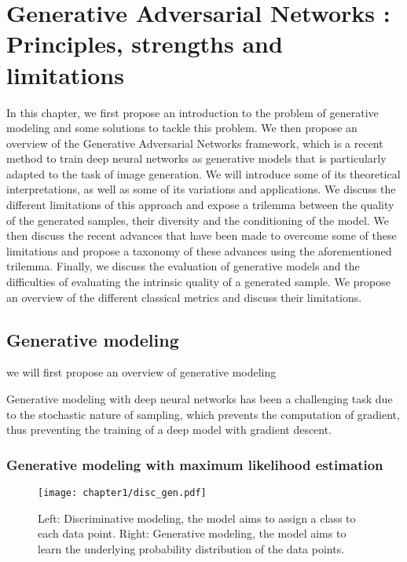 \chapter{Generative Adversarial Networks : Principles, strengths and limitations}
\label{chap:chapter1}

\begin{chapterabstract}
	In this chapter, we first propose an introduction to the problem of generative modeling and some solutions to tackle this problem. We then propose an overview of the Generative Adversarial Networks \citep{Goodfellow2014} framework, which is a recent method to train deep neural networks as generative models that is particularly adapted to the task of image generation. We will introduce some of its theoretical interpretations, as well as some of its variations and applications. We discuss the different limitations of this approach and expose a trilemma between the quality of the generated samples, their diversity and the conditioning of the model. We then discuss the recent advances that have been made to overcome some of these limitations and propose a taxonomy of these advances using the aforementioned trilemma. Finally, we discuss the evaluation of generative models and the difficulties of evaluating the intrinsic quality of a generated sample.  We propose an overview of the different classical metrics and discuss their limitations.
\end{chapterabstract}

\minitoc
\newpage

\section{Generative modeling}
we will first propose an overview of generative modeling

Generative modeling with deep neural networks has been a challenging task due to the stochastic nature of sampling, which prevents the computation of gradient, thus preventing the training of a deep model with gradient descent.  %

\subsection{Generative modeling with maximum likelihood estimation}

\begin{figure}
	\centering
	\texttt{[image: chapter1/disc\_gen.pdf]}
	\caption[Generative modeling]{Left: Discriminative modeling, the model aims to assign a class to each data point. Right: Generative modeling, the model aims to learn the underlying probability distribution of the data points.}
	\label{fig:disc_gen}
\end{figure}

